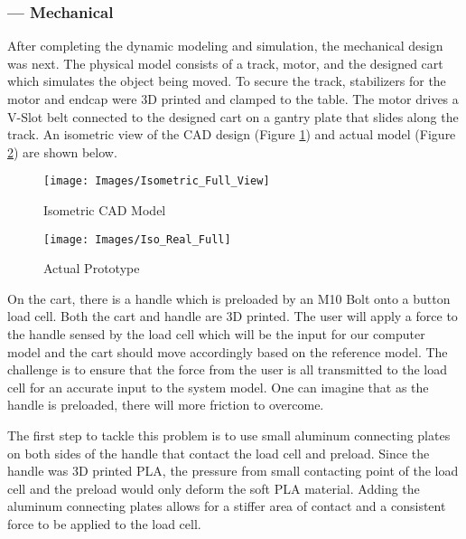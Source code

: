 \subsubsection*{ --- Mechanical} 
After completing the dynamic modeling and simulation, the mechanical design was next. The physical model consists of a track, motor, and the designed cart which simulates the object being moved. To secure the track, stabilizers for the motor and endcap were 3D printed and clamped to the table. The motor drives a V-Slot belt connected to the designed cart on a gantry plate that slides along the track. An isometric view of the CAD design (Figure \ref{fig:Isometric_Full_View}) and actual model (Figure \ref{fig:Iso_Real_Full}) are shown below.
\begin{figure}
	\begin{center}
		\texttt{[image: Images/Isometric\_Full\_View]}
		\caption{Isometric CAD Model}
		\label{fig:Isometric_Full_View}
	\end{center}
\end{figure}

\begin{figure}
	\begin{center}
		\texttt{[image: Images/Iso\_Real\_Full]}
		\caption{Actual Prototype}
		\label{fig:Iso_Real_Full}
	\end{center}
\end{figure}

On the cart, there is a handle which is preloaded by an M10 Bolt onto a button load cell. Both the cart and handle are 3D printed. The user will apply a force to the handle sensed by the load cell which will be the input for our computer model and the cart should move accordingly based on the reference model. The challenge is to ensure that the force from the user is all transmitted to the load cell for an accurate input to the system model. One can imagine that as the handle is preloaded, there will more friction to overcome.\par

The first step to tackle this problem is to use small aluminum connecting plates on both sides of the handle that contact the load cell and preload. Since the handle was 3D printed PLA, the pressure from small contacting point of the load cell and the preload would only deform the soft PLA material. Adding the aluminum connecting plates allows for a stiffer area of contact and a consistent force to be applied to the load cell.

